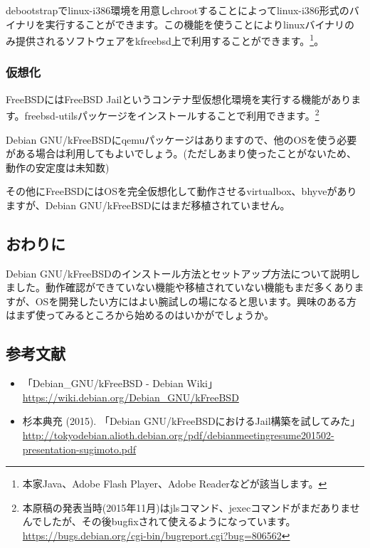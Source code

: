 \documentclass[mingoth,a4paper]{jsarticle}
\begin{document}
debootstrapでlinux-i386環境を用意しchrootすることによってlinux-i386形式のバイナリを実行することができます。この機能を使うことによりlinuxバイナリのみ提供されるソフトウェアをkfreebsd上で利用することができます。\footnote{本家Java、Adobe Flash Player、Adobe Readerなどが該当します。}。

\subsubsection{仮想化}

FreeBSDにはFreeBSD Jailというコンテナ型仮想化環境を実行する機能があります。freebsd-utilsパッケージをインストールすることで利用できます。\footnote{本原稿の発表当時(2015年11月)はjlsコマンド、jexecコマンドがまだありませんでしたが、その後bugfixされて使えるようになっています。 \url{https://bugs.debian.org/cgi-bin/bugreport.cgi?bug=806562}}

Debian GNU/kFreeBSDにqemuパッケージはありますので、他のOSを使う必要がある場合は利用してもよいでしょう。(ただしあまり使ったことがないため、動作の安定度は未知数)

その他にFreeBSDにはOSを完全仮想化して動作させるvirtualbox、bhyveがありますが、Debian GNU/kFreeBSDにはまだ移植されていません。

\subsection{おわりに}

Debian GNU/kFreeBSDのインストール方法とセットアップ方法について説明しました。動作確認ができていない機能や移植されていない機能もまだ多くありますが、OSを開発したい方にはよい腕試しの場になると思います。興味のある方はまず使ってみるところから始めるのはいかがでしょうか。

\subsection{参考文献}

\begin{itemize}
  \item 「Debian\_GNU/kFreeBSD - Debian Wiki」 \url{https://wiki.debian.org/Debian_GNU/kFreeBSD}
  \item 杉本典充 (2015). 「Debian GNU/kFreeBSDにおけるJail構築を試してみた」 \url{http://tokyodebian.alioth.debian.org/pdf/debianmeetingresume201502-presentation-sugimoto.pdf}
\end{itemize}

\end{document}
